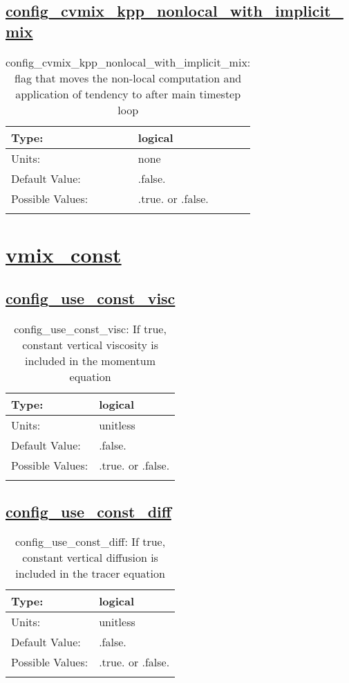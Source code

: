 \subsection[config\_cvmix\_kpp\_nonlocal\_with\_implicit\_mix]{\hyperref[sec:nm_tab_cvmix]{config\_cvmix\_kpp\_nonlocal\_with\_implicit\_mix}}
\label{subsec:nm_sec_config_cvmix_kpp_nonlocal_with_implicit_mix}
\begin{center}
\begin{longtable}{| p{2.0in} || p{4.0in} |}
    \hline
    Type: & logical \\
    \hline
    Units: & \si{none} \\
    \hline
    Default Value: & .false. \\
    \hline
    Possible Values: & .true. or .false. \\
    \hline
    \caption{config\_cvmix\_kpp\_nonlocal\_with\_implicit\_mix: flag that moves the non-local computation and application of tendency to after main timestep loop}
\end{longtable}
\end{center}
\section[vmix\_const]{\hyperref[sec:nm_tab_vmix_const]{vmix\_const}}
\label{sec:nm_sec_vmix_const}
\subsection[config\_use\_const\_visc]{\hyperref[sec:nm_tab_vmix_const]{config\_use\_const\_visc}}
\label{subsec:nm_sec_config_use_const_visc}
\begin{center}
\begin{longtable}{| p{2.0in} || p{4.0in} |}
    \hline
    Type: & logical \\
    \hline
    Units: & \si{unitless} \\
    \hline
    Default Value: & .false. \\
    \hline
    Possible Values: & .true. or .false. \\
    \hline
    \caption{config\_use\_const\_visc: If true, constant vertical viscosity is included in the momentum equation}
\end{longtable}
\end{center}
\subsection[config\_use\_const\_diff]{\hyperref[sec:nm_tab_vmix_const]{config\_use\_const\_diff}}
\label{subsec:nm_sec_config_use_const_diff}
\begin{center}
\begin{longtable}{| p{2.0in} || p{4.0in} |}
    \hline
    Type: & logical \\
    \hline
    Units: & \si{unitless} \\
    \hline
    Default Value: & .false. \\
    \hline
    Possible Values: & .true. or .false. \\
    \hline
    \caption{config\_use\_const\_diff: If true, constant vertical diffusion is included in the tracer equation}
\end{longtable}
\end{center}
